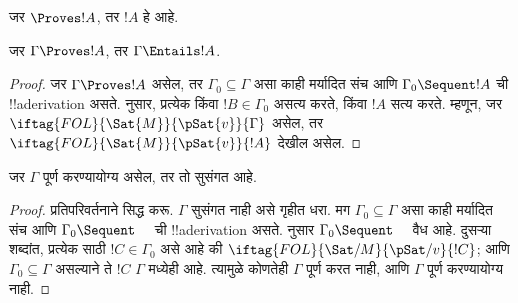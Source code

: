 \documentclass[../../../include/open-logic-section]{subfiles}
\begin{document}
\begin{cor}
जर $\Proves !A$, तर $!A$ हे  आहे.
\end{cor}

\begin{cor}
जर $\Gamma \Proves !A$, तर $\Gamma \Entails !A$.
\end{cor}

\begin{proof}
जर $\Gamma \Proves !A$ असेल, तर $\Gamma_0 \subseteq \Gamma$ असा काही
मर्यादित संच आणि $\Gamma_0 \Sequent !A$ ची !!a{derivation} असते. 
नुसार, प्रत्येक
किंवा $!B \in \Gamma_0$ असत्य करते, किंवा $!A$ सत्य करते. म्हणून,
जर $\iftag{FOL}{\Sat{M}}{\pSat{v}}{\Gamma}$ असेल, तर
$\iftag{FOL}{\Sat{M}}{\pSat{v}}{!A}$ देखील असेल.
\end{proof}

\begin{cor}
जर $\Gamma$ पूर्ण करण्यायोग्य असेल, तर तो सुसंगत आहे.
\end{cor}

\begin{proof}
प्रतिपरिवर्तनाने सिद्ध करू. $\Gamma$ सुसंगत नाही असे गृहीत धरा. मग
$\Gamma_0 \subseteq \Gamma$ असा काही मर्यादित संच आणि
$\Gamma_0 \Sequent \quad$ ची !!a{derivation} असते. 
नुसार $\Gamma_0 \Sequent \quad$ वैध आहे. दुसऱ्या शब्दांत, प्रत्येक
 साठी
$!C \in \Gamma_0$ असे आहे की
$\iftag{FOL}{\Sat/{M}}{\pSat/{v}}{!C}$; आणि $\Gamma_0 \subseteq \Gamma$
असल्याने ते $!C$ $\Gamma$ मध्येही आहे. त्यामुळे कोणतेही
 $\Gamma$ पूर्ण करत नाही, आणि
$\Gamma$ पूर्ण करण्यायोग्य नाही.
\end{proof}
\end{document}
